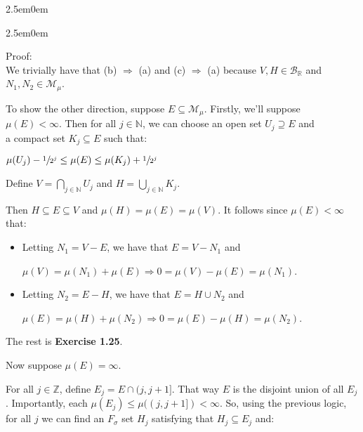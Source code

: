 \documentclass{book}
\newcommand{\hThree}{%
   \color{PineGreen!85!Orange}
   \fontsize{12}{14}\selectfont%
}
\newcommand{\exP}{%
   \color{Purple}%
   \fontsize{12}{14}\selectfont%
}
\newcommand{\exPP}{%
   \color{RedViolet}%
   \fontsize{12}{14}\selectfont%
}
\newenvironment{myIndent}{%
   \begin{adjustwidth}{2.5em}{0em}%
}{%
   \end{adjustwidth}%
}
\newcommand{\blab}[1]{\textbf{#1}}
\newcommand{\retTwo}{\hfill\bigbreak}
\begin{document}
\begin{myIndent}
\begin{itemize}
      \begin{myIndent}\hThree
         Proof:\\
         We trivially have that (b) $\Longrightarrow$ (a) and (c) $\Longrightarrow$ (a) because $V, H \in \mathcal{B}_\mathbb{R}$ and\\ $N_1, N_2 \in \mathcal{M}_\mu$.\retTwo

         To show the other direction, suppose $E \subseteq \mathcal{M}_{\mu}$. Firstly, we'll suppose\\ $\mu(E) < \infty$. Then for all $j \in \mathbb{N}$, we can choose an open set $U_j \supseteq E$ and\\ a compact set $K_j \subseteq E$ such that:

         {\centering $\mu(U_j) - \sfrac{1}{2^j} \leq \mu(E) \leq \mu(K_j) + \sfrac{1}{2^j}$ \retTwo\par}

         Define $V = \bigcap\limits_{j\in\mathbb{N}}U_j$ and $H = \bigcup\limits_{j \in \mathbb{N}}K_j$.\retTwo
         
         Then $H \subseteq E \subseteq V$ and $\mu(H) = \mu(E) = \mu(V)$. It follows since $\mu(E) < \infty$ that:
         
         \begin{itemize}
            \item[\bullet] Letting $N_1 = V - E$, we have that $E = V - N_1$ and
            
            {\centering $\mu(V) = \mu(N_1) + \mu(E) \Longrightarrow 0 = \mu(V) - \mu(E) = \mu(N_1)$.\par}

            \item[\bullet] Letting $N_2 = E - H$, we have that $E = H \cup N_2$ and
            
            {\centering $\mu(E) = \mu(H) + \mu(N_2) \Longrightarrow 0 = \mu(E) - \mu(H) =\mu(N_2)$. \retTwo\par}
         \end{itemize}

         \exP The rest is \blab{Exercise 1.25}.\\\exPP
         Now suppose $\mu(E) = \infty$.\retTwo
         
         For all $j \in \mathbb{Z}$, define $E_j = E \cap (j, j+1]$. That way $E$ is the disjoint union of all $E_j$. Importantly, each $\mu(E_j) \leq \mu((j, j+1]) < \infty$. So, using the previous logic, for all $j$ we can find an $F_\sigma$ set $H_j$ satisfying that $H_j \subseteq E_j$ and:


\end{myIndent}
\end{itemize}
\end{myIndent}
\end{document}
